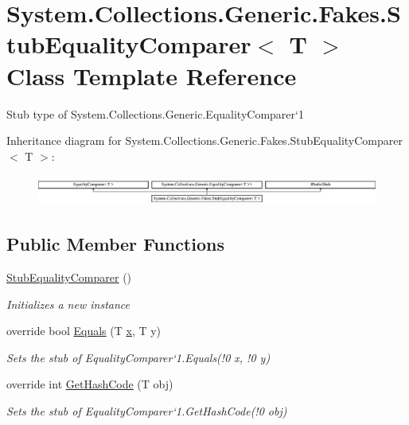 \hypertarget{class_system_1_1_collections_1_1_generic_1_1_fakes_1_1_stub_equality_comparer_3_01_t_01_4}{\section{System.\-Collections.\-Generic.\-Fakes.\-Stub\-Equality\-Comparer$<$ T $>$ Class Template Reference}
\label{class_system_1_1_collections_1_1_generic_1_1_fakes_1_1_stub_equality_comparer_3_01_t_01_4}
}


Stub type of System.\-Collections.\-Generic.\-Equality\-Comparer`1 


Inheritance diagram for System.\-Collections.\-Generic.\-Fakes.\-Stub\-Equality\-Comparer$<$ T $>$\-:\begin{figure}[H]
\begin{center}
\leavevmode
\includegraphics[height=1.000894cm]{class_system_1_1_collections_1_1_generic_1_1_fakes_1_1_stub_equality_comparer_3_01_t_01_4}
\end{center}
\end{figure}
\subsection*{Public Member Functions}
\begin{DoxyCompactItemize}
\item 
\hyperlink{class_system_1_1_collections_1_1_generic_1_1_fakes_1_1_stub_equality_comparer_3_01_t_01_4_ad561a594a9d5768a668ebe5adf895e23}{Stub\-Equality\-Comparer} ()
\begin{DoxyCompactList}\small\item\em Initializes a new instance\end{DoxyCompactList}\item 
override bool \hyperlink{class_system_1_1_collections_1_1_generic_1_1_fakes_1_1_stub_equality_comparer_3_01_t_01_4_a1e6474cb54e132c8bbae1f9373c0dc34}{Equals} (T \hyperlink{jquery-1_810_82_8min_8js_a5ce50d751c9664d05375c8f5080ed43e}{x}, T y)
\begin{DoxyCompactList}\small\item\em Sets the stub of Equality\-Comparer`1.Equals(!0 x, !0 y)\end{DoxyCompactList}\item 
override int \hyperlink{class_system_1_1_collections_1_1_generic_1_1_fakes_1_1_stub_equality_comparer_3_01_t_01_4_a8e71289b8fc10978ba14640d4c59c6c8}{Get\-Hash\-Code} (T obj)
\begin{DoxyCompactList}\small\item\em Sets the stub of Equality\-Comparer`1.Get\-Hash\-Code(!0 obj)\end{DoxyCompactList}\end{DoxyCompactItemize}
